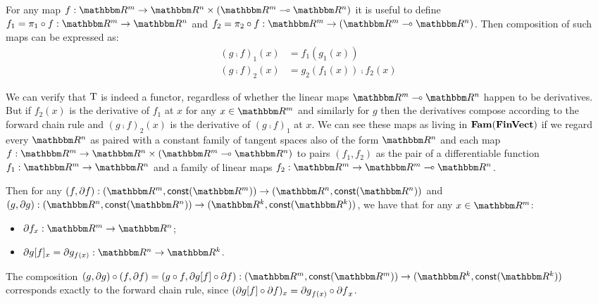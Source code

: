 For any map $f: \RR^m \to \RR^n \times (\RR^m \linearto \RR^n)$ it is useful to define $f_1 = \pi_1 \comp f:
\RR^m \to \RR^n$ and $f_2 = \pi_2 \comp f: \RR^m \to (\RR^m \linearto \RR^n)$. Then composition of such maps can be expressed as:
\begin{align*}
(g \comp f)_1(x) &= f_1(g_1(x)) \\
(g \comp f)_2(x) &= g_2(f_1(x)) \comp f_2(x)
\end{align*}

We can verify that $\mathrm{T}$ is indeed a functor, regardless of whether the linear maps $\RR^m \linearto
\RR^n$ happen to be derivatives. But if $f_2(x)$ is the derivative of $f_1$ at $x$ for any $x \in \RR^m$ and
similarly for $g$ then the derivatives compose according to the forward chain rule and $(g \comp f)_2(x)$ is
the derivative of $(g \comp f)_1$ at $x$. We can see these maps as living in $\mathbf{Fam}(\mathbf{FinVect})$ if we regard
every $\RR^n$ as paired with a constant family of tangent spaces also of the form $\RR^n$ and each map $f:
\RR^m \to \RR^n \times (\RR^m \linearto \RR^n)$ to pairs $(f_1, f_2)$ as the pair of a differentiable function
$f_1: \RR^m \to \RR^n$ and a family of linear maps $f_2: \RR^m \to \RR^m \linearto \RR^n$.

Then for any $(f, \partial f): (\RR^m, \const(\RR^m)) \to (\RR^n, \const(\RR^n))$ and $(g,
\partial g): (\RR^n, \const(\RR^n)) \to (\RR^k, \const(\RR^k))$, we have that for any $x \in \RR^m$:
\begin{itemize}
\item $\partial f_x: \RR^m \to \RR^n$;
\item $\reindex{\partial g}{f}_x = \partial g_{f(x)}: \RR^n \to \RR^k$.
\end{itemize}

\noindent The composition $(g, \partial g) \comp (f, \partial f) = (g \comp f, \reindex{\partial g}{f} \comp
\partial f): (\RR^m, \const(\RR^m)) \to (\RR^k, \const(\RR^k))$ corresponds exactly to the forward chain rule,
since $(\partial g[f] \circ \partial f)_x = {\partial g}_{f(x)} \circ {\partial f}_x$.
